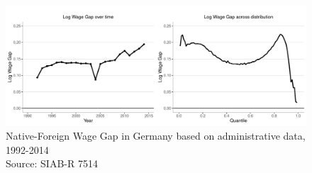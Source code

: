  
 
 
 \begin{figure}[H]
 	\centering
 	\includegraphics[width=1.\linewidth]{wgap_siab}
 	\caption{Native-Foreign Wage Gap in Germany based on administrative data, 1992-2014 \\ 
 		\medskip Source: SIAB-R 7514 \label{fig:wage_gap}}
 	
 \end{figure}
 
 
 
 
 

